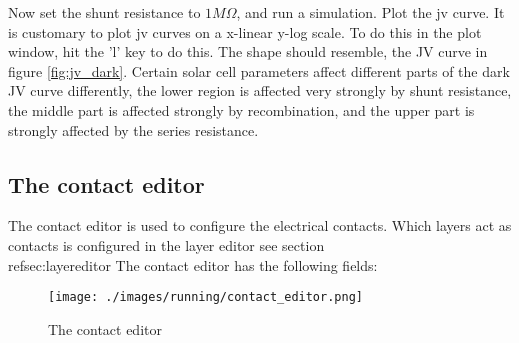 Now set the shunt resistance to $1M \Omega$, and run a simulation.  Plot the jv curve.  It is customary to plot jv curves on a x-linear y-log scale.  To do this in the plot window, hit the 'l' key to do this.  The shape should resemble, the JV curve in figure \ref{fig:jv_dark}.  Certain solar cell parameters affect different parts of the dark JV curve differently, the lower region is affected very strongly by shunt resistance, the middle part is affected strongly by recombination, and the upper part is strongly affected by the series resistance.


\vspace*{\fill}

\newpage
\subsection{The contact editor}
\label{sec:contacteditor}
The contact editor is used to configure the electrical contacts.  Which layers act as contacts is configured in the layer editor see section \\ref{sec:layereditor}  The contact editor has the following fields:

\begin{figure}[H]
\centering
\texttt{[image: ./images/running/contact\_editor.png]}
\caption{The contact editor}
\label{fig:contacteditor}
\end{figure}

